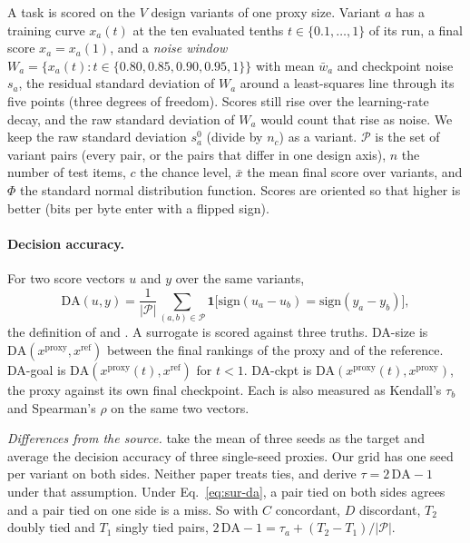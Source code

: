 A task is scored on the $V$ design variants of one proxy size.
Variant $a$ has a training curve $x_a(t)$ at the ten evaluated tenths $t \in \{0.1,\dots,1\}$ of its run, a final score $x_a = x_a(1)$, and a \emph{noise window} $W_a = \{x_a(t) : t \in \{0.80, 0.85, 0.90, 0.95, 1\}\}$ with mean $\bar{w}_a$ and checkpoint noise $s_a$, the residual standard deviation of $W_a$ around a least-squares line through its five points (three degrees of freedom). Scores still rise over the learning-rate decay, and the raw standard deviation of $W_a$ would count that rise as noise. We keep the raw standard deviation $s^{0}_a$ (divide by $n_c$) as a variant.
$\mathcal{P}$ is the set of variant pairs (every pair, or the pairs that differ in one design axis), $n$ the number of test items, $c$ the chance level, $\bar{x}$ the mean final score over variants, and $\Phi$ the standard normal distribution function.
Scores are oriented so that higher is better (bits per byte enter with a flipped sign).

\paragraph{Decision accuracy.} For two score vectors $u$ and $y$ over the same variants,
\begin{equation}
\mathrm{DA}(u, y) = \frac{1}{|\mathcal{P}|} \sum_{(a,b) \in \mathcal{P}} \mathbf{1}\big[\mathrm{sign}(u_a - u_b) = \mathrm{sign}(y_a - y_b)\big],
\label{eq:sur-da}
\end{equation}
the definition of \citet{magnusson_datadecide_2025} and \citet{heineman_signal_2025}.
A surrogate is scored against three truths. DA-size is $\mathrm{DA}(x^{\text{proxy}}, x^{\text{ref}})$ between the final rankings of the proxy and of the reference. DA-goal is $\mathrm{DA}(x^{\text{proxy}}(t), x^{\text{ref}})$ for $t < 1$. DA-ckpt is $\mathrm{DA}(x^{\text{proxy}}(t), x^{\text{proxy}})$, the proxy against its own final checkpoint.
Each is also measured as Kendall's $\tau_b$ and Spearman's $\rho$ on the same two vectors.

\emph{Differences from the source.}
\citet{magnusson_datadecide_2025} take the mean of three seeds as the target and average the decision accuracy of three single-seed proxies. Our grid has one seed per variant on both sides.
Neither paper treats ties, and \citet{heineman_signal_2025} derive $\tau = 2\,\mathrm{DA} - 1$ under that assumption.
Under Eq.~\ref{eq:sur-da}, a pair tied on both sides agrees and a pair tied on one side is a miss. So with $C$ concordant, $D$ discordant, $T_2$ doubly tied and $T_1$ singly tied pairs, $2\,\mathrm{DA} - 1 = \tau_a + (T_2 - T_1)/|\mathcal{P}|$.

